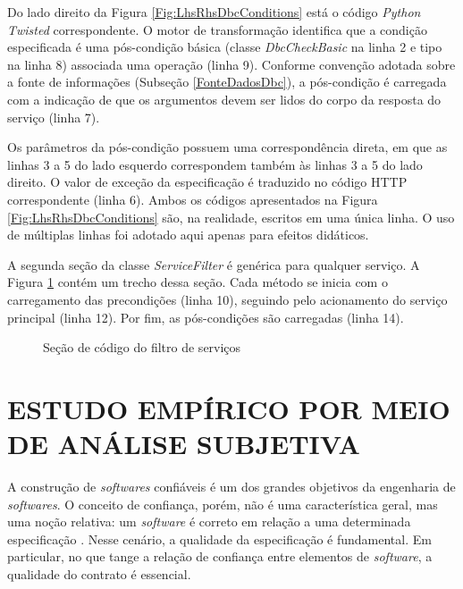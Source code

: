 Do lado direito da Figura \ref{Fig:LhsRhsDbcConditions} está o código
\emph{Python Twisted} correspondente. O motor de transformação identifica que a
condição especificada é uma pós-condição básica (classe \emph{DbcCheckBasic} na linha 2
e tipo na linha 8) associada uma operação  (linha 9). Conforme
convenção adotada sobre a fonte de informações (Subseção \ref{FonteDadosDbc}), a
pós-condição é carregada com a indicação de que os argumentos devem ser lidos do
corpo da resposta do serviço (linha 7).

Os parâmetros da pós-condição possuem uma correspondência direta, em que as
linhas 3 a 5 do lado esquerdo correspondem também às linhas 3 a 5 do lado
direito. O valor de exceção da especificação \neoidl{} é traduzido no código
HTTP correspondente (linha 6). Ambos os códigos apresentados na Figura
\ref{Fig:LhsRhsDbcConditions} são, na realidade, escritos em uma única linha.
O uso de múltiplas linhas foi adotado aqui apenas para efeitos didáticos.

A segunda seção da classe \emph{ServiceFilter} é genérica para
qualquer serviço. A Figura \ref{lst:filtrosServicosTwisted} contém um trecho
dessa seção. Cada método se inicia com o carregamento das precondições (linha
10), seguindo pelo acionamento do serviço principal (linha 12). Por fim,
as pós-condições são carregadas (linha 14).

\begin{figure}[h]
\begin{small}

\vspace{-.5cm}
\end{small} 
\caption{Seção de código do filtro de serviços}
\label{lst:filtrosServicosTwisted} 
\end{figure} 


\section{ESTUDO EMPÍRICO POR MEIO DE ANÁLISE SUBJETIVA} 
\label{analiseSubjetiva}
\vspace{-6mm}

A construção de \textit{softwares} confiáveis é um dos grandes objetivos da
engenharia de \textit{softwares}. O conceito de confiança, porém, não é uma
característica geral, mas uma noção relativa: um \textit{software} é correto em
relação a uma determinada especificação \cite{arnout2001net}. Nesse cenário, a
qualidade da especificação é fundamental. Em particular, no que tange a relação
de confiança entre elementos de \textit{software}, a qualidade do
contrato é essencial.

